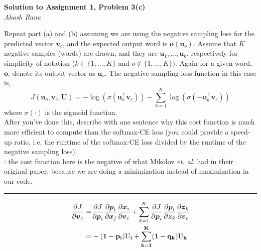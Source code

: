 \documentclass[letter,12pt]{article}
\newcommand{\myhwtitle}[3]
{\begin{center}
{\large {\bf Solution to Assignment {#1}, Problem {#2}}}\\
\medskip
{\it {#3}} %
\end{center}}
\newcommand{\solutionsAuthor}{Akash Rana}
\begin{document}
\myhwtitle{1}{3(c)}{\solutionsAuthor}
\bigskip
\noindent Repeat part (a) and (b) assuming we are using the negative sampling loss for the predicted vector ${\boldsymbol v}_{c}$, and 
the expected output word is ${\boldsymbol o}({\boldsymbol u}_{o})$. Assume that $K$ negative samples (words) are drawn, and they are ${\boldsymbol u}_{1},...,{\boldsymbol u}_{k}$, respectively for simplicity of notation ($k\in\{1,...,K\}$ and $o\notin\{1,...,K\}$). Again for a given word, ${\boldsymbol o}$, denote its output vector as ${\boldsymbol u}_{o}$. The negative sampling loss function in this case is,
\begin{equation}
J({\boldsymbol u}_{o}, {\boldsymbol v}_{c}, {\boldsymbol U}) = -\log(\sigma( {\boldsymbol u}^{\top}_{o}{\boldsymbol v}_{c})) - \sum^{K}_{k=1}\log(\sigma(- {\boldsymbol u}^{\top}_{k}{\boldsymbol v}_{c}))
\end{equation}
where $\sigma(\cdot)$ is the sigmoid function.\\

\noindent After you've done this, describe with one sentence why this cost function is much more efficient to
compute than the softmax-CE loss (you could provide a speed-up ratio, i.e. the runtime of the softmax-CE loss divided by the
runtime of the negative sampling loss).\\

: the cost function here is the negative of what Mikolov \textit{et. al.} had in their original paper,
because we are doing a minimization instead of maximization in our code.\vspace{5mm}

\noindent\rule{\textwidth}{0.4pt}\vspace{5mm}


\begin{align}
\frac{\partial J}{\partial{\boldsymbol v}_{c}} = &\frac{\partial J}{\partial{{\boldsymbol p}_{i}}}\frac{\partial{{\boldsymbol p}_{i}}}{\partial{\boldsymbol x}_{j}}\frac{\partial{{\boldsymbol x}_{i}}}{\partial{\boldsymbol v}_{c}} + \sum^{{K}}_{k=1}\frac{\partial J}{\partial{{\boldsymbol p}_{i}}}\frac{\partial{{\boldsymbol p}_{i}}}{\partial{\boldsymbol z}_{k}}\frac{\partial{{\boldsymbol z}_{k}}}{\partial{\boldsymbol v}_{c}} \\
=&-(\bf{1- \bf{p}_{i}}){\bf \textrm{U}_{i}} + \sum^{{K}}_{k=1}(\bf{1- \bf{q}_{k}}){\bf \textrm{U}_{k}}                                                              
\end{align}
\end{document}
